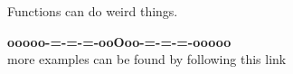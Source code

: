 \documentclass{ximera}
\begin{document}
Functions can do weird things.










\begin{onlineOnly}
\begin{center}
\textbf{\textcolor{green!50!black}{ooooo-=-=-=-ooOoo-=-=-=-ooooo}} \\

more examples can be found by following this link\\ 

\end{center}
\end{onlineOnly}
\end{document}
